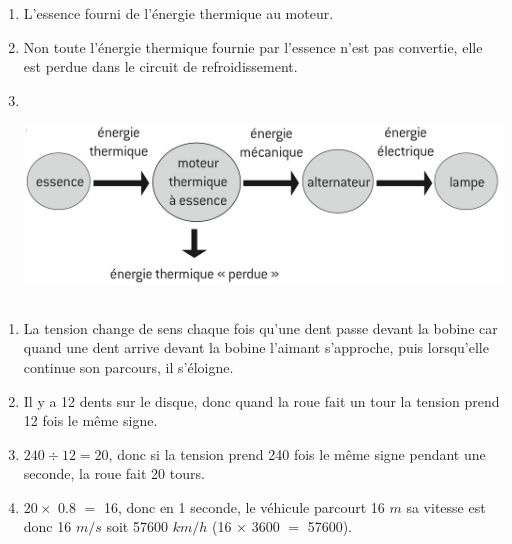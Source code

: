 \documentclass[12pt,a4paper]{article}
\begin{document}
\begin{enumerate}[label=\arabic*.]
	\item L'essence fourni de l'énergie thermique au moteur.
	\item Non toute l'énergie thermique fournie par l'essence n'est pas convertie, elle est perdue dans le circuit de refroidissement.
	\item \ \\ \begin{center}
		\includegraphics[scale=0.4]{exo15}
	\end{center}
\end{enumerate}


\subsection*{}

\begin{enumerate}[label=\arabic*.]
	\item La tension change de sens chaque fois qu'une dent passe devant la bobine car quand une dent arrive devant la bobine l'aimant s'approche, puis lorsqu'elle continue son parcours, il s'éloigne.
	\item Il y a 12 dents sur le disque, donc quand la roue fait un tour la tension prend 12 fois le même signe. 
	\item $240 \div 12 = 20$, donc si la tension prend 240 fois le même signe pendant une seconde, la roue fait 20 tours.
	\item $20 \times $ \num{0.8} $=$ \num{16}, donc en 1 seconde, le véhicule parcourt \num{16} $m$ sa vitesse est donc \num{16} $m/s$ soit \num{57600} $km/h$ (16 $\times $ \num{3600} $=$ \num{57600}).
\end{enumerate}
\end{document}
